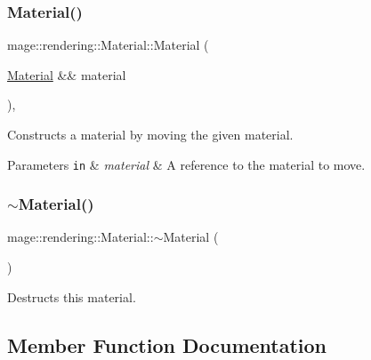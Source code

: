 \subsubsection{\texorpdfstring{Material()}{Material()}\hspace{0.1cm}{\footnotesize\ttfamily [3/3]}}
{\footnotesize\ttfamily mage\+::rendering\+::\+Material\+::\+Material (\begin{DoxyParamCaption}\item[{\hyperlink{classmage_1_1rendering_1_1_material}{Material} \&\&}]{material }\end{DoxyParamCaption})\hspace{0.3cm}{\ttfamily [default]}, {\ttfamily [noexcept]}}

Constructs a material by moving the given material.


\begin{DoxyParams}[1]{Parameters}
\mbox{\tt in}  & {\em material} & A reference to the material to move. \\
\hline
\end{DoxyParams}
\hypertarget{classmage_1_1rendering_1_1_material_a0dcdba799e013b2a8ff0108b14b9a73c}{}\label{classmage_1_1rendering_1_1_material_a0dcdba799e013b2a8ff0108b14b9a73c} 
\subsubsection{\texorpdfstring{$\sim$\+Material()}{~Material()}}
{\footnotesize\ttfamily mage\+::rendering\+::\+Material\+::$\sim$\+Material (\begin{DoxyParamCaption}{ }\end{DoxyParamCaption})\hspace{0.3cm}{\ttfamily [default]}}

Destructs this material. 

\subsection{Member Function Documentation}
\hypertarget{classmage_1_1rendering_1_1_material_a9b515c8968a5db43746fed088d67a514}{}\label{classmage_1_1rendering_1_1_material_a9b515c8968a5db43746fed088d67a514} 

